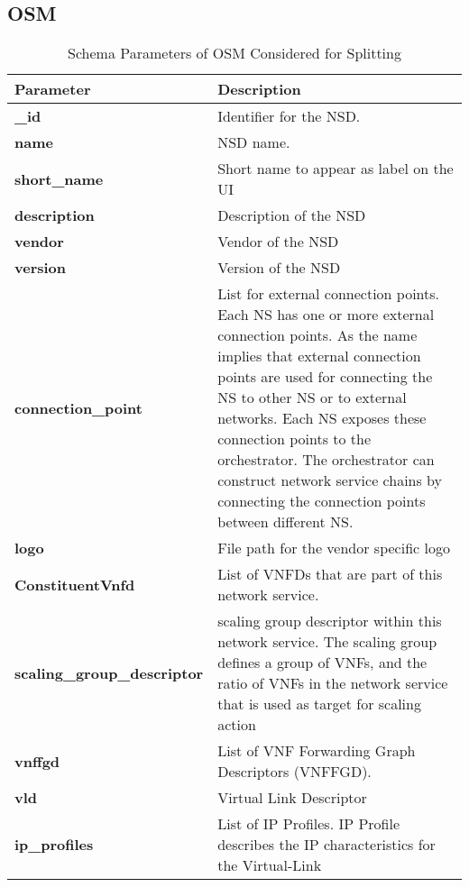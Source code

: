 \subsection{OSM}
\begin{table}[H]
	\begin{center}
		\caption{Schema Parameters of OSM Considered for Splitting}
		\label{tab:table2}
		\begin{tabular}{l|l} 
			\textbf{Parameter} & \textbf{Description} \\
			\hline
			\textbf{\_id} & Identifier for the NSD. \\ 
			\textbf{name} & NSD name. \\
			\textbf{short_name} & Short name to appear as label on the UI \\
			\textbf{description} & Description of the NSD \\
			\textbf{vendor} & Vendor of the NSD \\
			\textbf{version} & Version of the NSD \\
			\textbf{connection_point} & List for external connection points.
Each NS has one or more external connection
points. As the name implies that external
connection points are used for connecting
the NS to other NS or to external networks.
Each NS exposes these connection points to
the orchestrator. The orchestrator can
construct network service chains by
connecting the connection points between
different NS. \\
			\textbf{logo} & File path for the vendor specific logo \\
			\textbf{ConstituentVnfd} & List of VNFDs that are part of this
network service. \\
			\textbf{scaling_group_descriptor} & scaling group descriptor within this network service.
The scaling group defines a group of VNFs,
and the ratio of VNFs in the network service
that is used as target for scaling action \\
			\textbf{vnffgd} & List of VNF Forwarding Graph Descriptors (VNFFGD). \\
			\textbf{vld} & Virtual Link Descriptor \\
			\textbf{ip_profiles} & List of IP Profiles.
  IP Profile describes the IP characteristics for the Virtual-Link \\
		\end{tabular}
	\end{center}
\end{table}
